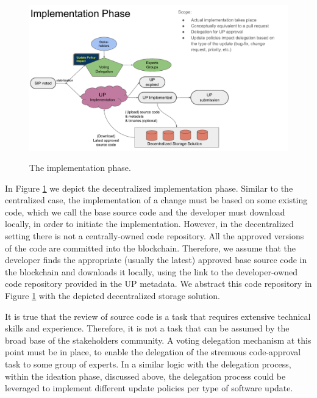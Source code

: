 \begin{figure}[H]
    \caption{The implementation phase.}
    \centering
    \includegraphics[width=0.9 \columnwidth,keepaspectratio]{figures/implementation_phase.pdf}
    \label{implementation}
\end{figure}

In Figure \ref{implementation} we depict the decentralized implementation phase. Similar to the centralized case, the implementation of a change must be based on some existing code, which we call the base source code and the developer must download locally, in order to initiate the implementation. However, in the decentralized setting there is not a centrally-owned code repository. All the approved versions of the code are committed into the blockchain. Therefore, we assume that the developer finds the appropriate (usually the latest) approved base source code in the blockchain and downloads it locally, using the link to the developer-owned code repository provided in the UP metadata. We abstract this code repository in Figure \ref{implementation} with the depicted decentralized storage solution.

It is true that the review of source code is a task that requires extensive technical skills and experience. Therefore, it is not a task that can be assumed by the broad base of the stakeholders community. A voting delegation mechanism at this point must be in place, to enable the delegation of the strenuous code-approval task to some group of experts. In a similar logic with the delegation process, within the ideation phase, discussed above, the delegation process could be leveraged to implement different update policies per type of software update.

